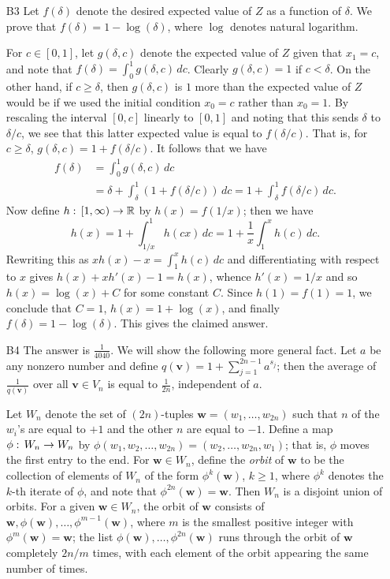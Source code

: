 \documentclass[amssymb,twocolumn,pra,10pt,aps]{revtex4-1}
\begin{document}
\begin{itemize}
\item[B3]
Let $f(\delta)$ denote the desired expected value of $Z$ as a function of $\delta$.
We prove that $f(\delta) = 1-\log(\delta)$, where $\log$ denotes natural logarithm.

For $c \in [0,1]$, let $g(\delta,c)$ denote the expected value of $Z$ given that $x_1=c$, and note that $f(\delta) = \int_0^1 g(\delta,c)\,dc$. Clearly $g(\delta,c) = 1$ if $c<\delta$. On the other hand, if $c\geq\delta$, then $g(\delta,c)$ is $1$ more than the expected value of $Z$ would be if we used the initial condition $x_0=c$ rather than $x_0=1$. By rescaling the interval $[0,c]$ linearly to $[0,1]$ and noting that this sends $\delta$ to $\delta/c$, we see that this latter expected value is equal to $f(\delta/c)$. That is, for $c\geq\delta$, $g(\delta,c) = 1+f(\delta/c)$. It follows that we have
\begin{align*}
f(\delta) &= \int_0^1 g(\delta,c)\,dc  \\
&= \delta + \int_\delta^1 (1+f(\delta/c))\,dc = 1+\int_\delta^1 f(\delta/c)\,dc.
\end{align*}
Now define $h :\thinspace [1,\infty) \to \mathbb{R}$ by $h(x) = f(1/x)$; then we have
\[
h(x) = 1+\int_{1/x}^1 h(cx)\,dc = 1+\frac{1}{x}\int_1^x h(c)\,dc.
\]
Rewriting this as $xh(x)-x = \int_1^x h(c)\,dc$ and differentiating with respect to $x$ gives
$h(x)+xh'(x)-1 = h(x)$, whence $h'(x) = 1/x$ and so $h(x) = \log(x)+C$ for some constant $C$. Since $h(1)=f(1)=1$, we conclude that $C=1$, $h(x) = 1+\log(x)$, and finally
$f(\delta) = 1-\log(\delta)$. This gives the claimed answer.

\item[B4]
The answer is $\frac{1}{4040}$. We will show the following more general fact. Let $a$ be any nonzero number and define $q(\mathbf{v}) = 1+\sum_{j=1}^{2n-1} a^{s_j}$; then the average of $\frac{1}{q(\mathbf{v})}$ over all $\mathbf{v} \in V_n$ is equal to $\frac{1}{2n}$, independent of $a$.

Let $W_n$ denote the set of $(2n)$-tuples $\mathbf{w} = (w_1,\ldots,w_{2n})$ such that $n$ of the $w_i$'s are equal to $+1$ and the other $n$ are equal to $-1$. Define a map $\phi :\thinspace W_n \to W_n$ by $\phi(w_1,w_2,\ldots,w_{2n}) = (w_2,\ldots,w_{2n},w_1)$; that is, $\phi$ moves the first entry to the end. For $\mathbf{w} \in W_n$, define the \textit{orbit} of $\mathbf{w}$ to be the collection of elements of $W_n$ of the form $\phi^k(\mathbf{w})$, $k \geq 1$, where $\phi^k$ denotes the $k$-th iterate of $\phi$, and note that $\phi^{2n}(\mathbf{w}) = \mathbf{w}$. Then $W_n$ is a disjoint union of orbits. For a given $\mathbf{w} \in W_n$, the orbit of $\mathbf{w}$ consists of $\mathbf{w},\phi(\mathbf{w}),\ldots,\phi^{m-1}(\mathbf{w})$, where $m$ is the smallest positive integer with $\phi^m(\mathbf{w}) = \mathbf{w}$; the list $\phi(\mathbf{w}),\ldots,\phi^{2n}(\mathbf{w})$ runs through the orbit of $\mathbf{w}$ completely $2n/m$ times, with each element of the orbit appearing the same number of times.


\end{itemize}
\end{document}
